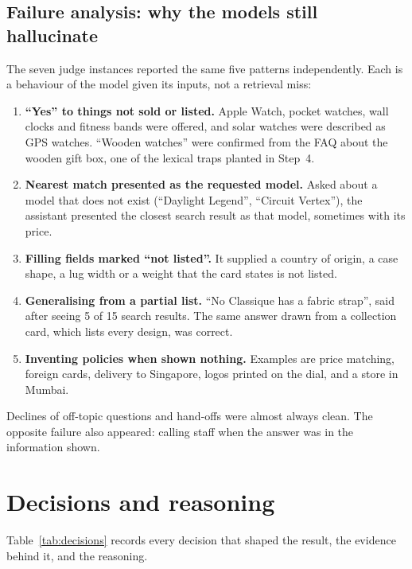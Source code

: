 \documentclass[11pt,a4paper]{article}
\begin{document}
\subsection{Failure analysis: why the models still hallucinate}\label{sec:failures}
The seven judge instances reported the same five patterns independently. Each is a behaviour of the model given its
inputs, not a retrieval miss:
\begin{enumerate}
  \item \textbf{``Yes'' to things not sold or listed.} Apple Watch, pocket watches, wall clocks and fitness bands were
        offered, and solar watches were described as GPS watches. ``Wooden watches'' were confirmed from the FAQ about the
        wooden gift box, one of the lexical traps planted in Step~4.
  \item \textbf{Nearest match presented as the requested model.} Asked about a model that does not exist (``Daylight
        Legend'', ``Circuit Vertex''), the assistant presented the closest search result as that model, sometimes with its
        price.
  \item \textbf{Filling fields marked ``not listed''.} It supplied a country of origin, a case shape, a lug width or a
        weight that the card states is not listed.
  \item \textbf{Generalising from a partial list.} ``No Classique has a fabric strap'', said after seeing 5 of 15 search
        results. The same answer drawn from a collection card, which lists every design, was correct.
  \item \textbf{Inventing policies when shown nothing.} Examples are price matching, foreign cards, delivery to
        Singapore, logos printed on the dial, and a store in Mumbai.
\end{enumerate}
Declines of off-topic questions and hand-offs were almost always clean. The opposite failure also appeared: calling staff
when the answer was in the information shown.

\section{Decisions and reasoning}\label{sec:decisions}

Table~\ref{tab:decisions} records every decision that shaped the result, the evidence behind it, and the reasoning.
\end{document}
